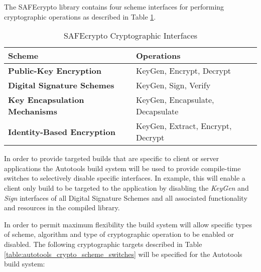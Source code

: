 The SAFEcrypto library contains four scheme interfaces for performing cryptographic operations as described in Table \ref{table:crypto_interfaces}.

\begin{table}[h]
\centering
\caption{SAFEcrypto Cryptographic Interfaces}
\label{table:crypto_interfaces}
\begin{tabularx}{\textwidth}{l p{13cm}}
\toprule
\textbf{Scheme} &\textbf{Operations}  \\
\midrule
\textbf{Public-Key Encryption} &KeyGen, Encrypt, Decrypt \\
\midrule
\textbf{Digital Signature Schemes} &KeyGen, Sign, Verify \\
\midrule
\textbf{Key Encapsulation Mechanisms} &KeyGen, Encapsulate, Decapsulate \\
\midrule
\textbf{Identity-Based Encryption} &KeyGen, Extract, Encrypt, Decrypt \\
\bottomrule
\end{tabularx}
\end{table}


In order to provide targeted builds that are specific to client or server applications the Autotools build system will be used to provide compile-time switches to selectively disable specific interfaces. In example, this will enable a client only build to be targeted to the application by disabling the \textit{KeyGen} and \textit{Sign} interfaces of all Digital Signature Schemes and all associated functionality and resources in the compiled library.

In order to permit maximum flexibility the build system will allow specific types of scheme, algorithm and type of cryptographic operation to be enabled or disabled. The following cryptographic targets described in Table \ref{table:autotools_crypto_scheme_switches} will be specified for the Autotools build system:

